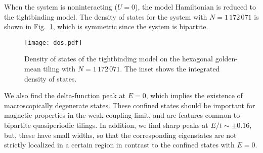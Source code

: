 \documentclass[aps,twocolumn,pra,superscriptaddress,amsmath,amssymb]{revtex4-1}
\begin{document}
When the system is noninteracting ($U=0$),
the model Hamiltonian is reduced to the tightbinding model.
The density of states for the system with $N=1\,172\,071$
is shown in Fig.~\ref{fig:dos}, which is symmetric since the system is bipartite.
\begin{figure}[htb]
 \texttt{[image: dos.pdf]}
 \caption{
   Density of states of the tightbinding model
   on the hexagonal golden-mean tiling with $N=1\,172\,071$.
   The inset shows the integrated density of states. 
 }
 \label{fig:dos}
\end{figure}
We also find the delta-function peak at $E=0$,
which implies the existence of macroscopically degenerate states.
These confined states should be important for magnetic properties
in the weak coupling limit, and are features common to
bipartite quasiperiodic tilings.
In addition, we find sharp peaks at $E/t\sim \pm 0.16$,
but, these have small widths, so that the corresponding eigenstates are not
strictly localized in a certain region
in contrast to the confined states with $E=0$.


\end{document}
